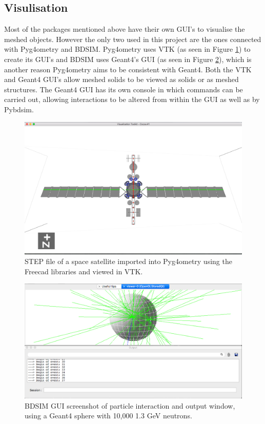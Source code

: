 \documentclass[12pt,a4paper]{article}
\begin{document}
\subsection{Visulisation}
Most of the packages mentioned above have their own GUI's to visualise the meshed objects. However the only two used in this project are the ones connected with Pyg4ometry and BDSIM. Pyg4ometry uses VTK (as seen in Figure \ref{sat}) to create its GUI's and BDSIM uses Geant4's GUI (as seen in Figure \ref{screengrab}), which is another reason Pyg4ometry aims to be consistent with Geant4. Both the VTK and Geant4 GUI's allow meshed solids to be viewed as solids or as meshed structures. The Geant4 GUI has its own console in which commands can be carried out, allowing interactions to be altered from within the GUI as well as by Pybdsim.

\begin{figure}[h!]
\centering
\includegraphics[scale=0.4]{Images//VTK/sat.png}
\caption[width=\columnwidth]{STEP file of a space satellite imported into Pyg4ometry using the Freecad libraries and viewed in VTK.}
\label{sat}
\end{figure}

\begin{figure}[h!]
\centering
\includegraphics[scale=0.4]{Images//BDSIM//screengrab.png}
\caption[width=\columnwidth]{BDSIM GUI screenshot of particle interaction and output window, using a Geant4 sphere with 10,000 1.3 GeV neutrons.}
\label{screengrab}
\end{figure}
\end{document}
